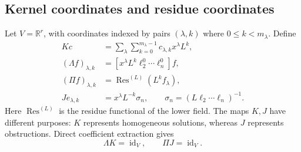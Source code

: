 \documentclass[11pt,a4paper]{article}
\numberwithin{equation}{section}
\theoremstyle{definition}
\theoremstyle{remark}
\newcommand{\R}{\mathbb R}
\newcommand{\Res}{\operatorname{Res}}
\newcommand{\id}{\operatorname{id}}
\newcommand{\coef}[2]{[#1]#2}
\begin{document}
\subsection{Kernel coordinates and residue coordinates}
Let $V=\R^r$, with coordinates indexed by pairs $(\lambda,k)$ where $0\le k<m_\lambda$. Define
\begin{align}
 Kc&=\sum_{\lambda}\sum_{k=0}^{m_\lambda-1}
 c_{\lambda,k}x^\lambda L^k,\\
 (\Lambda f)_{\lambda,k}
 &=\coef{x^\lambda L^k\ell_2^0\cdots\ell_n^0}{f},\\
 (\Pi f)_{\lambda,k}
 &=\Res^{(L)}(L^k f_\lambda),\\
 Je_{\lambda,k}&=x^\lambda L^{-k}\sigma_n,
 \qquad\sigma_n=(L\ell_2\cdots\ell_n)^{-1}.
 \label{eq:splitting-maps}
\end{align}
Here $\Res^{(L)}$ is the residue functional of the lower field. The maps $K,J$ have different purposes: $K$ represents homogeneous solutions, whereas $J$ represents obstructions. Direct coefficient extraction gives
\begin{equation}
 \Lambda K=\id_V,\qquad \Pi J=\id_V.
 \label{eq:sections}
\end{equation}
\end{document}
